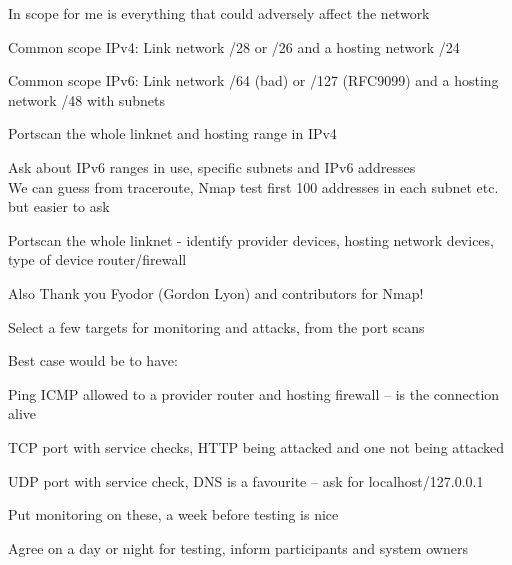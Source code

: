 \documentclass[Screen16to9,17pt]{foils}
\begin{document}



\begin{list2}
\item In scope for me is everything that could adversely affect the network
\item Common scope IPv4: Link network /28 or /26 and a hosting network /24
\item Common scope IPv6: Link network /64 (bad) or /127 (RFC9099) and a hosting network /48 with subnets
\end{list2}






\begin{list2}
\item Portscan the whole linknet and hosting range in IPv4
\item Ask about IPv6 ranges in use, specific subnets and IPv6 addresses\\
We can guess from traceroute, Nmap test first 100 addresses in each subnet etc. but easier to ask
\item Portscan the whole linknet - identify provider devices, hosting network devices, type of device router/firewall
\item Also Thank you Fyodor (Gordon Lyon) and contributors for Nmap!
\end{list2}



Select a few targets for monitoring and attacks, from the port scans

Best case would be to have:
\begin{list2}
\item Ping ICMP allowed to a provider router and hosting firewall -- is the connection alive
\item TCP port with service checks, HTTP being attacked and one not being attacked
\item UDP port with service check, DNS is a favourite -- ask for localhost/127.0.0.1
\item Put monitoring on these, a week before testing is nice
\item Agree on a day or night for testing, inform participants and system owners
\end{list2}
\end{document}
